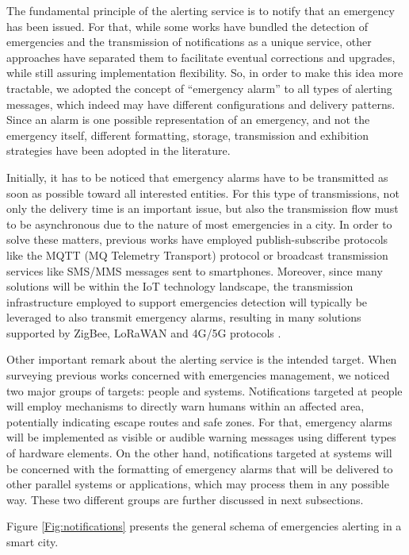 \begin{refsection}
The fundamental principle of the alerting service is to notify that an emergency has been issued. For that, while some works have bundled the detection of emergencies and the transmission of notifications as a unique service, other approaches have separated them to facilitate eventual corrections and upgrades, while still assuring implementation flexibility. So, in order to make this idea more tractable, we adopted the concept of ``emergency alarm'' to all types of alerting messages, which indeed may have different configurations and delivery patterns. Since an alarm is one possible representation of an emergency, and not the emergency itself, different formatting, storage, transmission and exhibition strategies have been adopted in the literature.

Initially, it has to be noticed that emergency alarms have to be transmitted as soon as possible toward all interested entities. For this type of transmissions, not only the delivery time is an important issue, but also the transmission flow must to be asynchronous due to the nature of most emergencies in a city. In order to solve these matters, previous works have employed publish-subscribe protocols like the MQTT (MQ Telemetry Transport) protocol or broadcast transmission services like SMS/MMS messages sent to smartphones. Moreover, since many solutions will be within the IoT technology landscape, the transmission infrastructure employed to support emergencies detection will typically be leveraged to also transmit emergency alarms, resulting in many solutions supported by ZigBee, LoRaWAN and 4G/5G protocols \cite{protocolsiot1,protocolsiot2}.

Other important remark about the alerting service is the intended target. When surveying previous works concerned with emergencies management, we noticed two major groups of targets: people and systems. Notifications targeted at people will employ mechanisms to directly warn humans within an affected area, potentially indicating escape routes and safe zones. For that, emergency alarms will be implemented as visible or audible warning messages using different types of hardware elements. On the other hand, notifications targeted at systems will be concerned with the formatting of emergency alarms that will be delivered to other parallel systems or applications, which may process them in any possible way. These two different groups are further discussed in next subsections.

Figure \ref{Fig:notifications} presents the general schema of emergencies alerting in a smart city.


\end{refsection}
